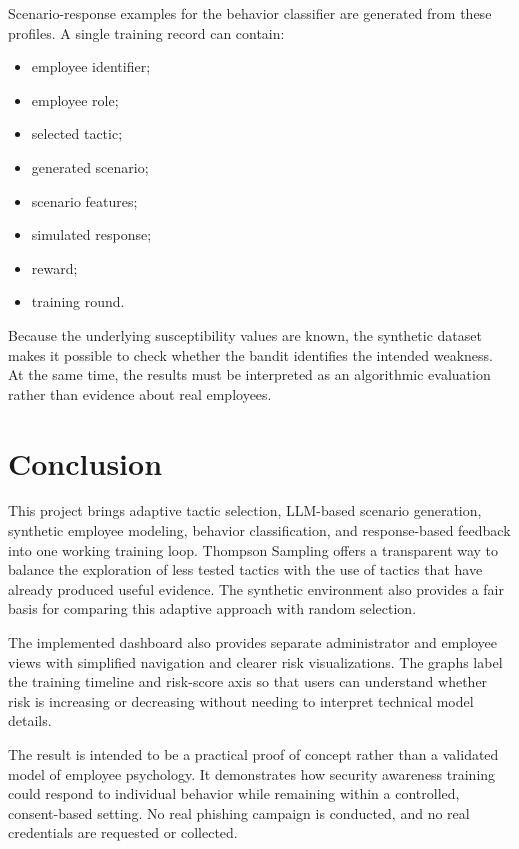 \documentclass[12pt,a4paper]{article}
\begin{document}
Scenario-response examples for the behavior classifier are generated
from these profiles. A single training record can contain:

\begin{itemize}
    \item employee identifier;
    \item employee role;
    \item selected tactic;
    \item generated scenario;
    \item scenario features;
    \item simulated response;
    \item reward;
    \item training round.
\end{itemize}

Because the underlying susceptibility values are known, the synthetic
dataset makes it possible to check whether the bandit identifies the
intended weakness. At the same time, the results must be interpreted as
an algorithmic evaluation rather than evidence about real employees.



\section{Conclusion}

This project brings adaptive tactic selection, LLM-based scenario
generation, synthetic employee modeling, behavior classification, and
response-based feedback into one working training loop. Thompson
Sampling offers a transparent way to balance the exploration of less
tested tactics with the use of tactics that have already produced
useful evidence. The synthetic environment also provides a fair basis
for comparing this adaptive approach with random selection.

The implemented dashboard also provides separate administrator and
employee views with simplified navigation and clearer risk visualizations.
The graphs label the training timeline and risk-score axis so that users
can understand whether risk is increasing or decreasing without needing
to interpret technical model details.

The result is intended to be a practical proof of concept rather than
a validated model of employee psychology. It demonstrates how security
awareness training could respond to individual behavior while remaining
within a controlled, consent-based setting. No real phishing campaign
is conducted, and no real credentials are requested or collected.

\clearpage
\nocite{*}
\begingroup
\justifying
\setlength{\bibhang}{0.5in}
\setlength{\bibitemsep}{0.75\baselineskip}
\setlength{\emergencystretch}{2em}
\printbibliography[heading=bibintoc,title={References}]
\endgroup
\end{document}
